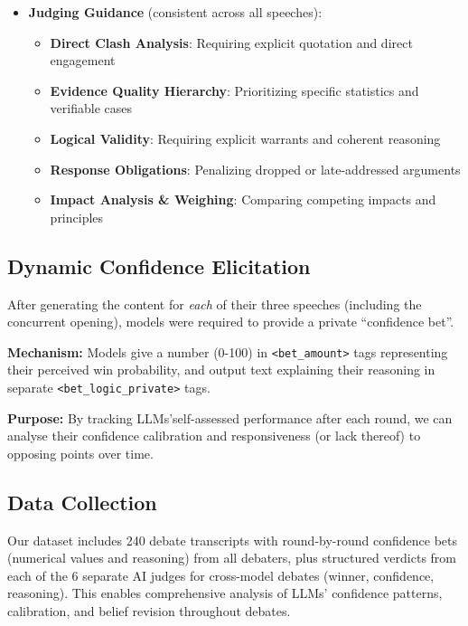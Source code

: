\documentclass{article}
\begin{document}
\begin{itemize}
 \item \textbf{Judging Guidance} (consistent across all speeches):
 \begin{itemize}
   \item \textbf{Direct Clash Analysis}: Requiring explicit quotation and direct engagement
   \item \textbf{Evidence Quality Hierarchy}: Prioritizing specific statistics and verifiable cases
   \item \textbf{Logical Validity}: Requiring explicit warrants and coherent reasoning
   \item \textbf{Response Obligations}: Penalizing dropped or late-addressed arguments
   \item \textbf{Impact Analysis \& Weighing}: Comparing competing impacts and principles
 \end{itemize}
\end{itemize}

\subsection{Dynamic Confidence Elicitation}
\label{subsec:confidence_elicitation}

After generating the content for \textit{each} of their three speeches (including the concurrent opening), models were required to provide a private ``confidence bet''.

\textbf{Mechanism:} Models give a number (0-100) in \texttt{\textless bet\_amount\textgreater} tags representing their perceived win probability, and output text explaining their reasoning in separate \texttt{\textless bet\_logic\_private\textgreater} tags.

\textbf{Purpose:} By tracking LLMs'self-assessed performance after each round, we can analyse their confidence calibration and responsiveness (or lack thereof) to opposing points over time.

\subsection{Data Collection}
\label{subsec:data_collection}
Our dataset includes 240 debate transcripts with round-by-round confidence bets (numerical values and reasoning) from all debaters, plus structured verdicts from each of the 6 separate AI judges for cross-model debates (winner, confidence, reasoning). This enables comprehensive analysis of LLMs' confidence patterns, calibration, and belief revision throughout debates.
\end{document}
